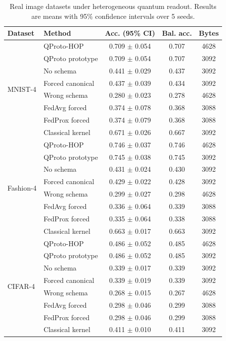 \begin{table}[t]
\centering
\caption{Real image datasets under heterogeneous quantum readout. Results are means with 95\% confidence intervals over 5 seeds.}
\label{tab:real-image-main}
\begin{tabular}{llccc}
\toprule
Dataset & Method & Acc. (95\% CI) & Bal. acc. & Bytes \\
\midrule
\multirow{8}{*}{MNIST-4}
& QProto-HOP & 0.709 $\pm$ 0.054 & 0.707 & 4628 \\
& QProto prototype & 0.709 $\pm$ 0.054 & 0.707 & 3092 \\
& No schema & 0.441 $\pm$ 0.029 & 0.437 & 3092 \\
& Forced canonical & 0.437 $\pm$ 0.039 & 0.434 & 3092 \\
& Wrong schema & 0.280 $\pm$ 0.023 & 0.278 & 4628 \\
& FedAvg forced & 0.374 $\pm$ 0.078 & 0.368 & 3088 \\
& FedProx forced & 0.374 $\pm$ 0.079 & 0.368 & 3088 \\
& Classical kernel & 0.671 $\pm$ 0.026 & 0.667 & 3092 \\
\midrule
\multirow{8}{*}{Fashion-4}
& QProto-HOP & 0.746 $\pm$ 0.037 & 0.746 & 4628 \\
& QProto prototype & 0.745 $\pm$ 0.038 & 0.745 & 3092 \\
& No schema & 0.431 $\pm$ 0.024 & 0.430 & 3092 \\
& Forced canonical & 0.429 $\pm$ 0.022 & 0.428 & 3092 \\
& Wrong schema & 0.299 $\pm$ 0.027 & 0.298 & 4628 \\
& FedAvg forced & 0.336 $\pm$ 0.064 & 0.339 & 3088 \\
& FedProx forced & 0.335 $\pm$ 0.064 & 0.338 & 3088 \\
& Classical kernel & 0.663 $\pm$ 0.017 & 0.663 & 3092 \\
\midrule
\multirow{8}{*}{CIFAR-4}
& QProto-HOP & 0.486 $\pm$ 0.052 & 0.485 & 4628 \\
& QProto prototype & 0.486 $\pm$ 0.052 & 0.485 & 3092 \\
& No schema & 0.339 $\pm$ 0.017 & 0.339 & 3092 \\
& Forced canonical & 0.339 $\pm$ 0.019 & 0.339 & 3092 \\
& Wrong schema & 0.268 $\pm$ 0.015 & 0.267 & 4628 \\
& FedAvg forced & 0.298 $\pm$ 0.046 & 0.299 & 3088 \\
& FedProx forced & 0.298 $\pm$ 0.046 & 0.299 & 3088 \\
& Classical kernel & 0.411 $\pm$ 0.010 & 0.411 & 3092 \\
\bottomrule
\end{tabular}
\end{table}
